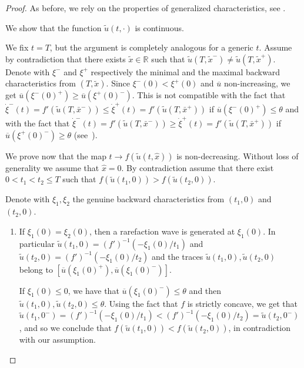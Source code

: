 \documentclass[a4paper, 10pt, final]{article}
\newcommand{\R}{\mathbb{R}} \newcommand{\N}{\mathbb{N}}
\begin{document}
\begin{proof}As before, we 
  rely on the properties of generalized characteristics, see \cite{d}. 

 
We show that 
  the function $\widetilde{u}(t, \cdot)$ is continuous. 
  
  We fix $t=T$, but the argument is completely analogous for a generic $t$. 
  Assume by contradiction that there exists $\widetilde  x \in \R$ such that
  $\widetilde{u}(T, \widetilde x^-) \ne \widetilde{u}(T, \widetilde x^+)$. Denote with $\xi^-$ and
  $\xi^+$ respectively the minimal and the maximal backward characteristics from $(T, \widetilde  x)$. 
  Since  $\xi^-(0) < \xi^+(0)$
  and $\overline u$ non-increasing, we get $\overline u (\xi^-(0)^+) \geq \overline u(\xi^+(0)^-)$.
  This is not compatible with the fact that    $\dot \xi^- (t) = f'(\widetilde{u}(T, \bar x^-))\leq \dot \xi^+ (t) = f'(\widetilde{u}(T, \bar x^+))$ if $ \overline u (\xi^-(0)^+)\leq \theta$ and with the fact that $\dot \xi^- (t) = f'(\widetilde{u}(T, \bar x^-))\geq \dot \xi^+ (t) = f'(\widetilde{u}(T, \bar x^+))$ if $ \overline u (\xi^+(0)^-)\geq \theta$
  (see~\cite[(11.1.13) and Theorem~11.1.3]{daf-book}).  

We prove now that the map $t\to f(\widetilde{u}(t, \hat x))$ is non-decreasing. 
 Without loss of generality we assume that $\hat{x} = 0$.
 By contradiction assume that there exist $0 < t_1 < t_2\leq T$ such that
  $f(\widetilde{u}(t_1, 0)) >f(\widetilde{u}(t_2, 0))$. 
  

  Denote with $\xi_1, \xi_2$ the genuine backward characteristics   from $(t_1, 0)$ and $(t_2, 0)$.
  \begin{enumerate}
 \item   If $\xi_1(0) = \xi_2(0)$, then a rarefaction wave is generated at $\xi_1(0)$. 
  In particular  $\widetilde u(t_1,0)=(f')^{-1}(-\xi_1(0) /t_1)$ 
  and $\widetilde u(t_2,0)=(f')^{-1}(-\xi_1(0) /t_2)$ and the traces
  $\widetilde u(t_1,0),\widetilde u(t_2,0)$ belong to $[\overline u (\xi_1(0)^+), \overline u(\xi_1(0)^-)]$.
  
  If $\xi_1(0)\leq 0$, we have that  $\overline u(\xi_1(0)^-)\leq \theta$ and then  $\widetilde u(t_1,0),\widetilde u(t_2,0)\leq \theta$. Using the fact that  $f$ is strictly concave, we get that $\widetilde u(t_1,0^-) = (f')^{-1}(-\xi_1(0)/t_1)
  < (f')^{-1}(-\xi_1(0)/t_2) = \widetilde u(t_2,0^-)$, and so we conclude  that $f(\widetilde u(t_1,0))< f(\widetilde u(t_2,0))$, in contradiction with our assumption. 


\end{enumerate}
\end{proof}
\end{document}
